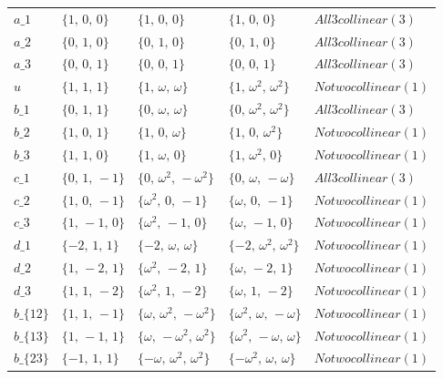 \documentclass[pra,twocolumn,nofootinbib]{revtex4-2}
\begin{document}
\begin{tabular}{l l l l l}
$a\_1$ & $\{1,\,0,\,0\}$ & $\{1,\,0,\,0\}$ & $\{1,\,0,\,0\}$ & $All 3 collinear (3)$ \\
$a\_2$ & $\{0,\,1,\,0\}$ & $\{0,\,1,\,0\}$ & $\{0,\,1,\,0\}$ & $All 3 collinear (3)$ \\
$a\_3$ & $\{0,\,0,\,1\}$ & $\{0,\,0,\,1\}$ & $\{0,\,0,\,1\}$ & $All 3 collinear (3)$ \\
$u$ & $\{1,\,1,\,1\}$ & $\{1,\,\omega,\,\omega\}$ & $\{1,\,\omega^2,\,\omega^2\}$ & $No two collinear (1)$ \\
$b\_1$ & $\{0,\,1,\,1\}$ & $\{0,\,\omega,\,\omega\}$ & $\{0,\,\omega^2,\,\omega^2\}$ & $All 3 collinear (3)$ \\
$b\_2$ & $\{1,\,0,\,1\}$ & $\{1,\,0,\,\omega\}$ & $\{1,\,0,\,\omega^2\}$ & $No two collinear (1)$ \\
$b\_3$ & $\{1,\,1,\,0\}$ & $\{1,\,\omega,\,0\}$ & $\{1,\,\omega^2,\,0\}$ & $No two collinear (1)$ \\
$c\_1$ & $\{0,\,1,\,-1\}$ & $\{0,\,\omega^2,\,-\omega^2\}$ & $\{0,\,\omega,\,-\omega\}$ & $All 3 collinear (3)$ \\
$c\_2$ & $\{1,\,0,\,-1\}$ & $\{\omega^2,\,0,\,-1\}$ & $\{\omega,\,0,\,-1\}$ & $No two collinear (1)$ \\
$c\_3$ & $\{1,\,-1,\,0\}$ & $\{\omega^2,\,-1,\,0\}$ & $\{\omega,\,-1,\,0\}$ & $No two collinear (1)$ \\
$d\_1$ & $\{-2,\,1,\,1\}$ & $\{-2,\,\omega,\,\omega\}$ & $\{-2,\,\omega^2,\,\omega^2\}$ & $No two collinear (1)$ \\
$d\_2$ & $\{1,\,-2,\,1\}$ & $\{\omega^2,\,-2,\,1\}$ & $\{\omega,\,-2,\,1\}$ & $No two collinear (1)$ \\
$d\_3$ & $\{1,\,1,\,-2\}$ & $\{\omega^2,\,1,\,-2\}$ & $\{\omega,\,1,\,-2\}$ & $No two collinear (1)$ \\
$b\_\{12\}$ & $\{1,\,1,\,-1\}$ & $\{\omega,\,\omega^2,\,-\omega^2\}$ & $\{\omega^2,\,\omega,\,-\omega\}$ & $No two collinear (1)$ \\
$b\_\{13\}$ & $\{1,\,-1,\,1\}$ & $\{\omega,\,-\omega^2,\,\omega^2\}$ & $\{\omega^2,\,-\omega,\,\omega\}$ & $No two collinear (1)$ \\
$b\_\{23\}$ & $\{-1,\,1,\,1\}$ & $\{-\omega,\,\omega^2,\,\omega^2\}$ & $\{-\omega^2,\,\omega,\,\omega\}$ & $No two collinear (1)$ \\

\end{tabular}
\end{document}
